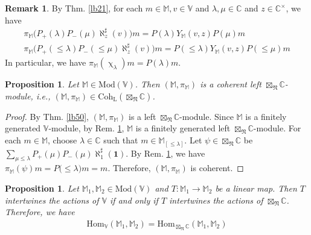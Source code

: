 \documentclass[11pt,b5paper,notitlepage]{article}
\theoremstyle{definition}
\newtheorem{rem}[df]{Remark}
\theoremstyle{plain}
\newtheorem{pp}[df]{Proposition}
\newcommand{\idt}{\mathbf{1}}
\newcommand{\Hom}{\mathrm{Hom}}
\newcommand{\Vbb}{\mathbb V}
\newcommand{\Mbb}{\mathbb M}
\newcommand{\Cbb}{\mathbb C}
\newcommand{\<}{\left\langle}
\renewcommand{\>}{\right\rangle}
\newcommand{\Mod}{\mathrm{Mod}}
\newcommand{\fn}{\mathfrak{N}}
\newcommand{\Coh}{{\mathrm{Coh}_{\mathrm L}}}
\numberwithin{equation}{section}
\begin{document}
\begin{rem}\label{lb25}
By Thm. \ref{lb21}, for each $m\in \Mbb,v\in \Vbb$ and $\lambda,\mu\in \Cbb$ and $z\in\Cbb^{\times}$, we have 
\begin{subequations}\label{eq83}
\begin{gather}
	\pi_\Mbb\big(P_+(\lambda)P_-(\mu)\aleph_z^\sharp(v)\big)m=P(\lambda)Y_\Mbb(v,z)P(\mu)m\label{eq83a}\\
\pi_\Mbb\big(P_+(\leq \lambda)P_-(\leq \mu)\aleph_z^\sharp(v)\big)m=P(\leq \lambda)Y_\Mbb(v,z)P(\leq \mu)m\label{eq83b}
\end{gather}
\end{subequations}
In particular, we have $\pi_\Mbb(\upchi_\lambda)m=P(\lambda)m$.
\end{rem}






\begin{pp}\label{lb28}
Let $\Mbb\in\Mod(\Vbb)$. Then $(\Mbb,\pi_\Mbb)$ is a coherent left $\boxtimes_\fn\Cbb$-module, i.e., $(\Mbb,\pi_\Mbb)\in \Coh(\boxtimes_\fn\Cbb)$.
\end{pp}


\begin{proof}
By Thm. \ref{lb50}, $(\Mbb,\pi_\Mbb)$ is a left $\boxtimes_\fn\Cbb$-module. Since $\Mbb$ is a finitely generated $\Vbb$-module, by Rem. \ref{lb25}, $\Mbb$ is a finitely generated left $\boxtimes_\fn\Cbb$-module. For each $m\in \Mbb$, choose $\lambda\in \Cbb$ such that $m\in \Mbb_{[\leq \lambda]}$. Let $\psi\in\boxtimes_\fn\Cbb$ be $\sum_{\mu\leq\lambda}P_+(\mu)P_-(\mu)\aleph_1^\sharp(\idt)$. By Rem. \ref{lb25}, we have $\pi_\Mbb(\psi)m=P({\leq\lambda)}m=m$. Therefore, $(\Mbb,\pi_\Mbb)$ is coherent.
\end{proof}


\begin{pp}\label{lb27}
Let $\Mbb_1,\Mbb_2\in \Mod(\Vbb)$ and $T:\Mbb_1\rightarrow \Mbb_2$ be a linear map. Then $T$ intertwines the actions of $\Vbb$ if and only if $T$ intertwines the actions of $\boxtimes_\fn\Cbb$. Therefore, we have
\begin{align*}
\Hom_\Vbb(\Mbb_1,\Mbb_2)=\Hom_{\boxtimes_\fn\Cbb}(\Mbb_1,\Mbb_2)
\end{align*}
\end{pp}
\end{document}
